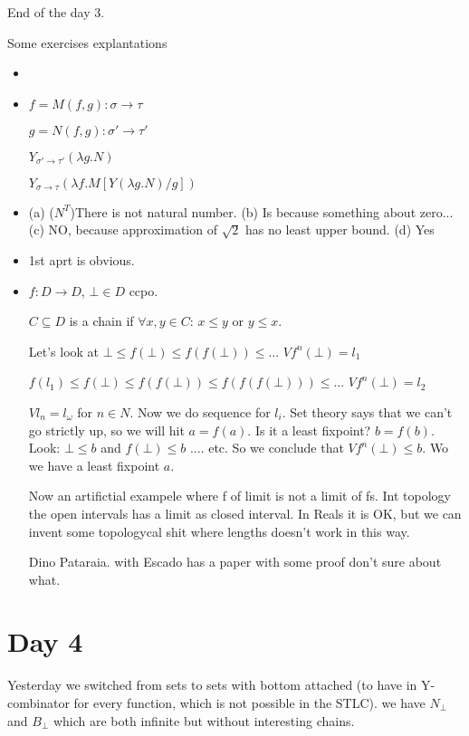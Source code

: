 \documentclass[a4paper,10pt]{book}
\newcommand{\rarr}{ \rightarrow }
\begin{document}
End of the day 3.


Some exercises explantations

\begin{itemize}
 \item 
 \item $f = M (f, g) : \sigma \rarr \tau$
 
 $g = N(f,g) : \sigma' \rarr \tau'$
 
 $Y_{\sigma' \rarr \tau'} (\lambda g . N)$
 
 $Y_{\sigma \rarr \tau} (\lambda f . M[Y(\lambda g . N) / g])$
 \item (a) ($N^T$)There is not natural number.
   (b) Is because something about zero...
   (c) NO, because approximation of $\sqrt{2}$ has no least upper bound.
   (d) Yes
 \item 1st aprt is obvious.
 \item $f:D \rarr D$, $\bot \in D$ ccpo.
 
 $C \subseteq  D$ is a chain  if $\forall x,y \in C$: $x \leq y$ or $y\leq x$.
 
 Let's look at $\bot \leq f(\bot) \leq f(f(\bot)) \leq ...$ $Vf^n(\bot) = l_1$

 $f(l_1) \leq f(\bot) \leq f(f(\bot)) \leq f(f(f(\bot))) \leq ...$ $Vf^n(\bot) = l_2$
 
 $V l_n = l_\omega$ for $n\in N$. Now we do  sequence for $l_i$. 
 Set theory says that we can't go strictly up,  so we will hit $a=f(a)$. Is it a least fixpoint?
 $b=f(b)$. Look: $\bot \leq b$ and $f(\bot) \leq b$ .... etc. So we conclude that 
 $V f^n(\bot) \leq b$. Wo we have a least fixpoint $a$.
 
 Now an artifictial exampele where f of limit is not a limit of fs. Int topology the 
 open intervals has a limit as closed interval. In Reals it is OK, but we can invent some topologycal
 shit where lengths doesn't work in this way.
 
 Dino Pataraia. with Escado has a paper with some proof don't sure about what.
 
 \end{itemize}

 
\section{Day 4} 
Yesterday we switched from sets to sets with bottom attached (to have in Y-combinator 
for every function, which is not possible in the STLC).
we have $N_\bot$ and $B_\bot$ which are both infinite but without interesting chains.
\end{document}
